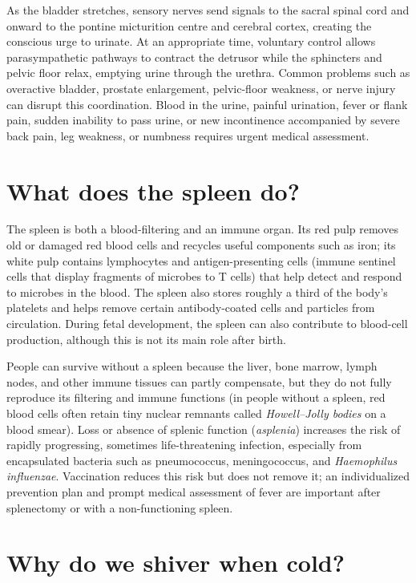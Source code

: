 \documentclass[11pt,oneside]{report}
\begin{document}
As the bladder stretches, sensory nerves send signals to the sacral spinal cord
and onward to the pontine micturition centre and cerebral cortex, creating the
conscious urge to urinate. At an appropriate time, voluntary control allows
parasympathetic pathways to contract the detrusor while the sphincters and
pelvic floor relax, emptying urine through the urethra. Common problems such as
overactive bladder, prostate enlargement, pelvic-floor weakness, or nerve
injury can disrupt this coordination. Blood in the urine, painful urination,
fever or flank pain, sudden inability to pass urine, or new incontinence
accompanied by severe back pain, leg weakness, or numbness requires urgent
medical assessment.

\section{What does the spleen do?}

The spleen is both a blood-filtering and an immune organ. Its red pulp removes
old or damaged red blood cells and recycles useful components such as iron; its
white pulp contains lymphocytes and antigen-presenting cells (immune sentinel
cells that display fragments of microbes to T cells) that help detect
and respond to microbes in the blood. The spleen also stores roughly a third
of the body's platelets and helps remove certain antibody-coated cells and
particles from circulation. During
fetal development, the spleen can also contribute to blood-cell production,
although this is not its main role after birth.

People can survive without a spleen because the liver, bone marrow, lymph nodes,
and other immune tissues can partly compensate, but they do not fully reproduce
its filtering and immune functions (in people without a spleen, red blood cells
often retain tiny nuclear remnants called \emph{Howell--Jolly bodies} on a
blood smear). Loss or absence of splenic function (\emph{asplenia}) increases
the risk of rapidly progressing, sometimes life-threatening infection,
especially from encapsulated bacteria such as pneumococcus, meningococcus, and
\emph{Haemophilus influenzae}. Vaccination reduces this risk but does not remove it;
an individualized prevention plan and prompt medical assessment of fever are
important after splenectomy or with a non-functioning spleen.

\section{Why do we shiver when cold?}
\end{document}
